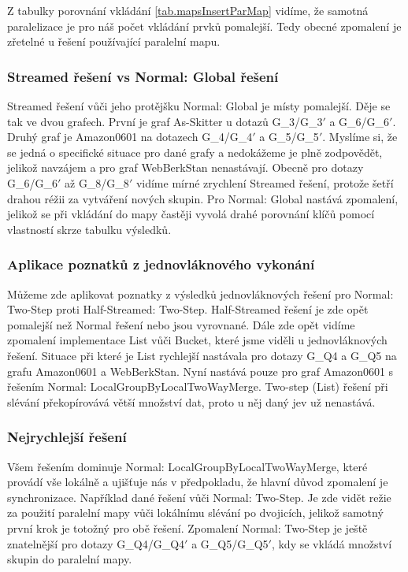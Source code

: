 Z tabulky porovnání vkládání \ref{tab.mapsInsertParMap} vidíme, že samotná paralelizace je pro náš počet vkládání prvků pomalejší. 
Tedy obecné zpomalení je zřetelné u řešení používající paralelní mapu.

\subsubsection{Streamed řešení vs Normal: Global řešení}

Streamed řešení vůči jeho protějšku Normal: Global je místy pomalejší. 
Děje se tak ve dvou grafech.
První je graf As-Skitter u dotazů  G\_3/G\_3$'$ a  G\_6/G\_6$'$.
Druhý graf je Amazon0601 na dotazech G\_4/G\_4$'$ a  G\_5/G\_5$'$.
Myslíme si, že se jedná o specifické situace pro dané grafy a nedokážeme je plně zodpovědět, jelikož navzájem a pro graf WebBerkStan nenastávají.
Obecně pro dotazy G\_6/G\_6$'$ až G\_8/G\_8$'$ vidíme mírné zrychlení Streamed řešení, protože šetří drahou réžii za vytváření nových skupin.
Pro Normal: Global nastává zpomalení, jelikož se při vkládání do mapy častěji vyvolá drahé porovnání klíčů pomocí vlastností skrze tabulku výsledků. 

\subsubsection{Aplikace poznatků z jednovláknového vykonání}

Můžeme zde aplikovat poznatky z výsledků jednovláknových řešení pro Normal: Two-Step proti Half-Streamed: Two-Step.
Half-Streamed řešení je zde opět pomalejší než Normal řešení nebo jsou vyrovnané.
Dále zde opět vidíme zpomalení implementace List vůči Bucket, které jsme viděli u jednovláknových řešení.
Situace při které je List rychlejší nastávala pro dotazy G\_Q4 a G\_Q5 na grafu Amazon0601 a WebBerkStan.
Nyní nastává pouze pro graf Amazon0601 s řešením Normal: LocalGroupByLocalTwoWayMerge.
Two-step (List) řešení při slévání překopírovává větší množství dat, proto u něj daný jev už nenastává. 

\subsubsection{Nejrychlejší řešení}

Všem řešením dominuje Normal: LocalGroupByLocalTwoWayMerge, které provádí vše lokálně a ujišťuje nás v předpokladu, že hlavní důvod zpomalení je synchronizace.
Například dané řešení vůči Normal: Two-Step. 
Je zde vidět režie za použití paralelní mapy vůči lokálnímu slévání po dvojicích, jelikož samotný první krok je totožný pro obě řešení.
Zpomalení Normal: Two-Step je ještě znatelnější pro dotazy G\_Q4/G\_Q4$'$ a G\_Q5/G\_Q5$'$, kdy se vkládá množství skupin do paralelní mapy.


